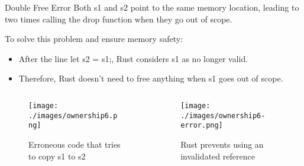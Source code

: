 \documentclass[10pt]{beamer}
\begin{document}
\begin{frame}{Double Free Error}
    Both s1 and s2 point to the same memory location, leading to two times calling the drop function when they go out of scope.

    To solve this problem and ensure memory safety:
    \begin{itemize}
        \item After the line let s2 = s1;, Rust considers s1 as no longer valid.
        \item Therefore, Rust doesn’t need to free anything when s1 goes out of scope.
    \end{itemize}

    \begin{columns}
        \begin{column}{0.4\textwidth}
            \begin{figure}[htpb]
                \centering
                \texttt{[image: ./images/ownership6.png]}
                \caption{Erroneous code that tries to copy s1 to s2\cite{rust-book}}
            \end{figure}
        \end{column}
        \begin{column}{0.6\textwidth}
            \begin{figure}[htpb]
                \centering
                \texttt{[image: ./images/ownership6-error.png]}
                \caption{Rust prevents using an invalidated reference\cite{rust-book}}
            \end{figure}
        \end{column}
    \end{columns}

\end{frame}
\end{document}
